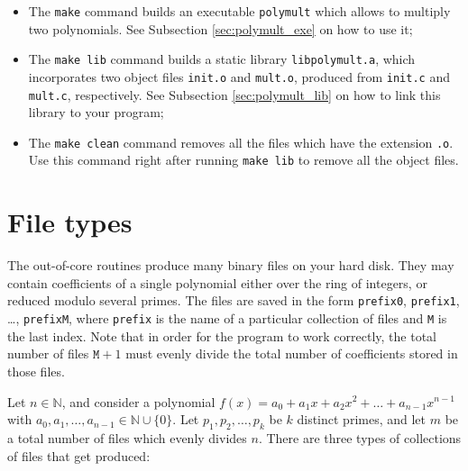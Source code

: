 \documentclass[a4paper,10pt]{article}
\newcommand{\code}{\lstinline}
\begin{document}
\begin{itemize}

\item The \code{make} command builds an executable \code{polymult} which allows to multiply two polynomials. See Subsection \ref{sec:polymult_exe} on how to use it;

\item The \code{make lib} command builds a static library \code{libpolymult.a}, which incorporates two object files \code{init.o} and \code{mult.o}, produced from \code{init.c} and \code{mult.c}, respectively. See Subsection \ref{sec:polymult_lib} on how to link this library to your program;

\item The \code{make clean} command removes all the files which have the extension \code{.o}. Use this command right after running \code{make lib} to remove all the object files.

\end{itemize}





\section{File types}

The out-of-core routines produce many binary files on your hard disk. They may contain coefficients of a single polynomial either over the ring of integers, or reduced modulo several primes. The files are saved in the form \code{prefix0}, \code{prefix1}, \ldots, \code{prefixM}, where \code{prefix} is the name of a particular collection of files and \code{M} is the last index. Note that in order for the program to work correctly, the total number of files $\texttt{M} + 1$ must evenly divide the total number of coefficients stored in those files.

Let $n \in \mathbb N$, and consider a polynomial $f(x) = a_0 + a_1x + a_2x^2 + \ldots + a_{n-1}x^{n-1}$ with $a_0, a_1, \ldots, a_{n-1} \in \mathbb N \cup \{0\}$. Let $p_1, p_2, \ldots, p_k$ be $k$ distinct primes, and let $m$ be a total number of files which evenly divides $n$. There are three types of collections of files that get produced:
\end{document}

